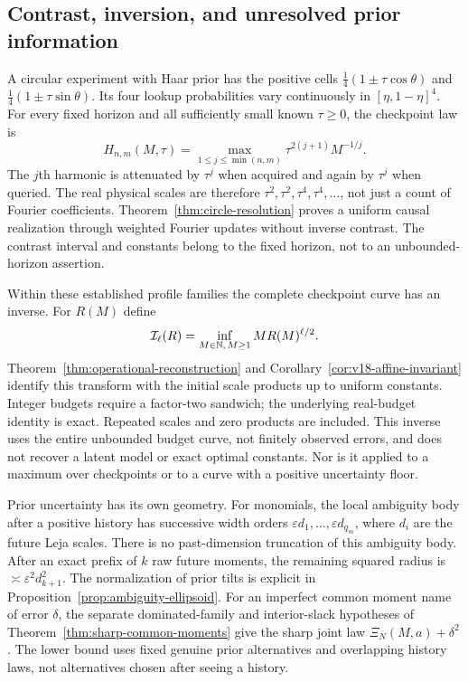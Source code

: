 \documentclass[11pt]{amsart}
\theoremstyle{definition}\newtheorem{definition}[theorem]{Definition}
\theoremstyle{remark}\newtheorem{remark}[theorem]{Remark}
\begin{document}
\subsection{Contrast, inversion, and unresolved prior information}
A circular experiment with Haar prior has the positive cells
$\tfrac14(1\pm\tau\cos\theta)$ and
$\tfrac14(1\pm\tau\sin\theta)$. Its four lookup probabilities vary
continuously in $[\eta,1-\eta]^4$. For every fixed horizon and all
sufficiently small known $\tau\ge0$, the checkpoint law is
\[
 H_{n,m}(M,\tau)=
   \max_{1\le j\le\min(n,m)}\tau^{2(j+1)}M^{-1/j}.
\]
The $j$th harmonic is attenuated by $\tau^j$ when acquired and again
by $\tau^j$ when queried. The real physical scales are therefore
$\tau^2,\tau^2,\tau^4,\tau^4,\ldots$, not just a count of Fourier
coefficients. Theorem~\ref{thm:circle-resolution} proves a uniform
causal realization through weighted Fourier updates without inverse
contrast. The contrast interval and constants belong to the fixed
horizon, not to an unbounded-horizon assertion.

Within these established profile families the complete checkpoint curve
has an inverse. For $R(M)$ define
\[
 \mathcal I_\ell(R)=\inf_{M\in\mathbb N,\,M\ge1}M R(M)^{\ell/2}.
\]
Theorem~\ref{thm:operational-reconstruction} and
Corollary~\ref{cor:v18-affine-invariant} identify this transform with
the initial scale products up to uniform constants. Integer budgets
require a factor-two sandwich; the underlying real-budget identity is
exact. Repeated scales and zero products are included. This inverse
uses the entire unbounded budget curve, not finitely observed errors,
and does not recover a latent model or exact optimal constants. Nor is
it applied to a maximum over checkpoints or to a curve with a positive
uncertainty floor.

Prior uncertainty has its own geometry. For monomials, the local
ambiguity body after a positive history has successive width orders
$\varepsilon d_1,\ldots,\varepsilon d_{q_m}$, where $d_i$ are the
future Leja scales. There is no past-dimension truncation of this
ambiguity body. After an exact prefix of $k$ raw future moments,
the remaining squared radius is $\asymp\varepsilon^2d_{k+1}^2$.
The normalization of prior tilts is explicit in
Proposition~\ref{prop:ambiguity-ellipsoid}. For an imperfect common
moment name of error $\delta$, the separate dominated-family and
interior-slack hypotheses of Theorem~\ref{thm:sharp-common-moments}
give the sharp joint law $\Xi_N(M,a)+\delta^2$. The lower bound
uses fixed genuine prior alternatives and overlapping history laws,
not alternatives chosen after seeing a history.
\end{document}
